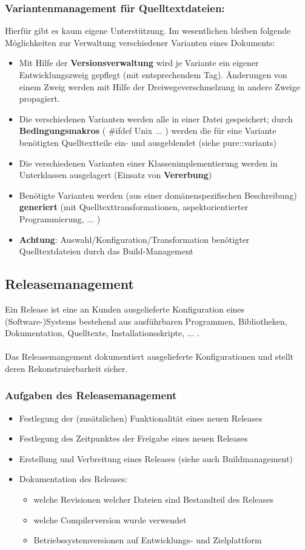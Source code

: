 \subsubsection{Variantenmanagement für Quelltextdateien:}
Hierfür gibt es kaum eigene Unterstützung. Im wesentlichen bleiben folgende Möglichkeiten zur Verwaltung verschiedener Varianten eines Dokuments:
\begin{itemize}
	\item Mit Hilfe der \textbf{Versionsverwaltung} wird je Variante ein eigener Entwicklungszweig gepflegt (mit entsprechendem Tag). Änderungen von einem Zweig werden mit Hilfe der Dreiwegeverschmelzung in andere Zweige propagiert.
	\item  Die verschiedenen Varianten werden alle in einer Datei gespeichert; durch \textbf{Bedingungsmakros} ( \#ifdef Unix ... ) werden die für eine Variante benötigten Quelltextteile ein- und ausgeblendet (siehe pure::variants)
	\item Die verschiedenen Varianten einer Klassenimplementierung werden in Unterklassen ausgelagert (Einsatz von \textbf{Vererbung})
	\item Benötigte Varianten werden (aus einer domänenspezifischen Beschreibung) \textbf{generiert} (mit Quelltexttransformationen, aspektorientierter Programmierung, ... )
	\item \textbf{Achtung}: Auswahl/Konfiguration/Transformation benötigter Quelltextdateien durch das Build-Management
\end{itemize}
\subsection{Releasemanagement}
Ein Release ist eine an Kunden ausgelieferte Konfiguration eines (Software-)Systems bestehend aus ausführbaren Programmen, Bibliotheken, Dokumentation, Quelltexte, Installationsskripte, ... . 
\\
\\
Das Releasemangement dokumentiert ausgelieferte Konfigurationen und stellt deren Rekonstruierbarkeit sicher.
\subsubsection{Aufgaben des Releasemanagement}
\begin{itemize}
	\item Festlegung der (zusätzlichen) Funktionalität eines neuen Releases
	\item Festlegung des Zeitpunktes der Freigabe eines neuen Releases 
	\item  Erstellung und Verbreitung eines Releases (siehe auch Buildmanagement)
	\item  Dokumentation des Releases:
	\begin{itemize}
		\item welche Revisionen welcher Dateien sind Bestandteil des Releases
		\item welche Compilerversion wurde verwendet
		\item Betriebssystemversionen auf Entwicklungs- und Zielplattform
	\end{itemize}
\end{itemize}
